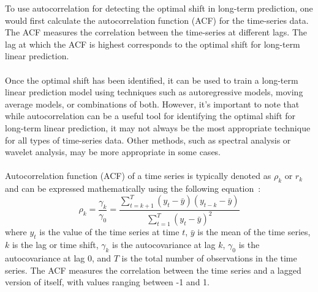     To use autocorrelation for detecting the optimal shift in long-term prediction, one would first calculate the autocorrelation
    function (ACF) for the time-series data. The ACF measures the correlation between the time-series at different lags. The lag at which the ACF is highest
    corresponds to the optimal shift for long-term linear prediction.\\
    \\
    Once the optimal shift has been identified, it can be used to train a long-term linear prediction model using techniques such as autoregressive
    models, moving average models, or combinations of both. However, it's important to note that while autocorrelation can be a useful tool for
    identifying the optimal shift for long-term linear prediction, it may not always be the most appropriate technique for all types of time-series data.
    Other methods, such as spectral analysis or wavelet analysis, may be more appropriate in some cases.\\
    \\
    Autocorrelation function (ACF) of a time series is typically denoted as $\rho_k$ or $r_k$ and can be expressed mathematically using the following equation~\cite{box2015time}:
    \begin{equation}
        \rho_k = \frac{\gamma_k}{\gamma_0} = \frac{\sum_{t=k+1}^{T}(y_t - \bar{y})(y_{t-k} - \bar{y})}{\sum_{t=1}^{T}(y_t - \bar{y})^2}
    \end{equation}
    where $y_t$ is the value of the time series at time $t$, $\bar{y}$ is the mean of the time series, $k$ is the lag or time shift, $\gamma_k$ is the
    autocovariance at lag $k$, $\gamma_0$ is the autocovariance at lag 0, and $T$ is the total number of observations in the time series.
    The ACF measures the correlation between the time series and a lagged version of itself, with values ranging between -1 and 1.

